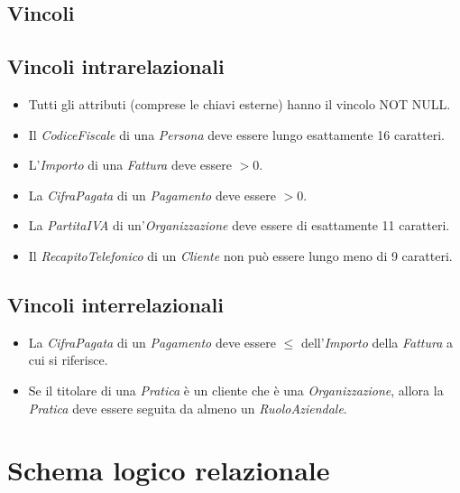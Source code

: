 \documentclass[a4paper,12pt]{article}
\begin{document}
 \subsection{ Vincoli }

\subsection{ Vincoli intrarelazionali }

\begin{itemize}
\item Tutti gli attributi (comprese le chiavi esterne) hanno il vincolo NOT NULL.

\item Il \textit{CodiceFiscale} di una \textit{Persona} deve essere lungo esattamente 16 caratteri.

\item L'\textit{Importo} di una \textit{Fattura} deve essere $> 0$.

\item La \textit{CifraPagata} di un \textit{Pagamento} deve essere $> 0$.

\item La \textit{PartitaIVA} di un'\textit{Organizzazione} deve essere di esattamente 11 caratteri.

\item Il \textit{RecapitoTelefonico} di un \textit{Cliente} non può essere lungo meno di 9 caratteri.
\end{itemize}

\subsection{ Vincoli interrelazionali }

\begin{itemize}
\item La \textit{CifraPagata} di un \textit{Pagamento} deve essere $\leq$ dell'\textit{Importo} della \textit{Fattura} a cui si riferisce.

\item Se il titolare di una \textit{Pratica} è un cliente che è una \textit{Organizzazione}, allora la \textit{Pratica} deve essere seguita da almeno un \textit{RuoloAziendale}.
\end{itemize}

 \section{ Schema logico relazionale }
\end{document}
